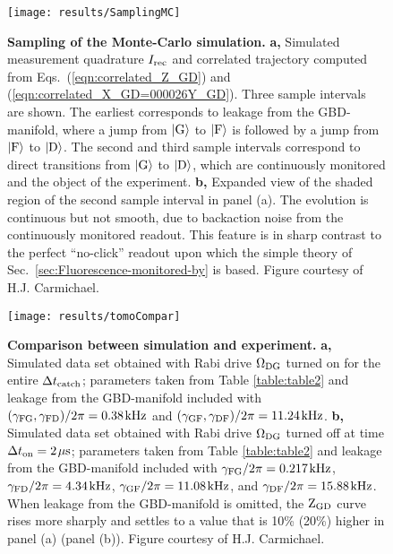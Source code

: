 \begin{figure}[t]
\centering{}\texttt{[image: results/SamplingMC]}\caption[Sampling of the Monte-Carlo simulation (courtesy of H.J. Carmichael)]{\label{fig:monte-carlo} \textbf{Sampling of the Monte-Carlo simulation.}
\textbf{a,} Simulated measurement quadrature $I_{{\rm rec}}$ and
correlated trajectory computed from Eqs.~(\ref{eqn:correlated_Z_GD})
and (\ref{eqn:correlated_X_GD=000026Y_GD}). Three sample intervals
are shown. The earliest corresponds to leakage from the GBD-manifold,
where a jump from $|{\rm G}\rangle$ to $|{\rm F}\rangle$ is followed
by a jump from $|{\rm F}\rangle$ to $|{\rm D}\rangle$. The second
and third sample intervals correspond to direct transitions from $|{\rm G}\rangle$
to $|{\rm D}\rangle$, which are continuously monitored and the object
of the experiment. \textbf{b,} Expanded view of the shaded region
of the second sample interval in panel (a). The evolution is continuous
but not smooth, due to backaction noise from the continuously monitored
readout. This feature is in sharp contrast to the perfect ``no-click''
readout upon which the simple theory of Sec.~\ref{sec:Fluorescence-monitored-by}
is based. Figure courtesy of H.J. Carmichael.}
\end{figure}

\begin{figure}
\centering{}\texttt{[image: results/tomoCompar]}\caption[Comparison between simulation and experiment (courtesy of H.J. Carmichael)]{\label{fig:simulation_vs_experiment} \textbf{Comparison between
simulation and experiment.} \textbf{a,} Simulated data set obtained
with Rabi drive $\Omega_{{\rm DG}}$ turned on for the entire $\Delta t_{{\rm catch}}$;
parameters taken from Table \ref{table:table2} and leakage from the
GBD-manifold included with $(\gamma_{{\rm FG}},\gamma_{{\rm FD}})/2\pi=0.38\mkern2mu {\rm kHz}$
and $(\gamma_{{\rm GF}},\gamma_{{\rm DF}})/2\pi=11.24\mkern2mu {\rm kHz}$.
\textbf{b,} Simulated data set obtained with Rabi drive $\Omega_{{\rm DG}}$
turned off at time $\Delta t_{{\rm on}}=2\mkern2mu \mu{\rm s}$; parameters
taken from Table \ref{table:table2} and leakage from the GBD-manifold
included with $\gamma_{{\rm FG}}/2\pi=0.217\mkern2mu {\rm kHz}$,
$\gamma_{{\rm FD}}/2\pi=4.34\mkern2mu {\rm kHz}$, $\gamma_{{\rm GF}}/2\pi=11.08\mkern2mu {\rm kHz}$,
and $\gamma_{{\rm DF}}/2\pi=15.88\mkern2mu {\rm kHz}$. When leakage
from the GBD-manifold is omitted, the ${\rm Z}_{{\rm GD}}$ curve
rises more sharply and settles to a value that is 10\% (20\%) higher
in panel (a) (panel (b)). Figure courtesy of H.J. Carmichael.}
\end{figure}

